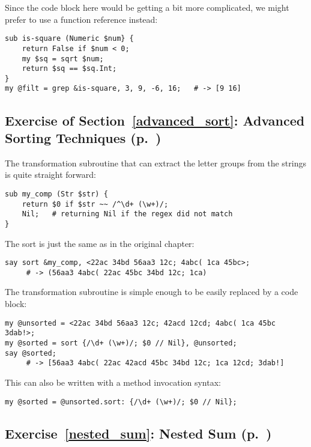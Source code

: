 Since the code block here would be getting a bit more 
complicated, we might prefer to use a function 
reference instead:

\begin{verbatim}
sub is-square (Numeric $num} { 
    return False if $num < 0;
    my $sq = sqrt $num;
    return $sq == $sq.Int;
} 
my @filt = grep &is-square, 3, 9, -6, 16;   # -> [9 16]
\end{verbatim}
%
\subsection{Exercise of Section~\ref{advanced_sort}: Advanced Sorting Techniques (p.~\pageref{sort_exercise})}
\label{sol_sort_exercise}

The transformation subroutine that can extract the letter 
groups from the strings is quite straight forward:

\begin{verbatim}
sub my_comp (Str $str) {
    return $0 if $str ~~ /^\d+ (\w+)/; 
    Nil;   # returning Nil if the regex did not match
}
\end{verbatim}
%
The sort is just the same as in the original chapter:
\begin{verbatim}
say sort &my_comp, <22ac 34bd 56aa3 12c; 4abc( 1ca 45bc>;
     # -> (56aa3 4abc( 22ac 45bc 34bd 12c; 1ca)
\end{verbatim}

The transformation subroutine is simple enough to be easily 
replaced by a code block:

\begin{verbatim}
my @unsorted = <22ac 34bd 56aa3 12c; 42acd 12cd; 4abc( 1ca 45bc 3dab!>;
my @sorted = sort {/\d+ (\w+)/; $0 // Nil}, @unsorted;
say @sorted; 
     # -> [56aa3 4abc( 22ac 42acd 45bc 34bd 12c; 1ca 12cd; 3dab!]
\end{verbatim}
%
This can also be written with a method invocation syntax:
\begin{verbatim}
my @sorted = @unsorted.sort: {/\d+ (\w+)/; $0 // Nil};
\end{verbatim}
%

\subsection{Exercise~\ref{nested_sum}: Nested Sum (p.~\pageref{nested_sum})}
\label{sol_nested_sum}

